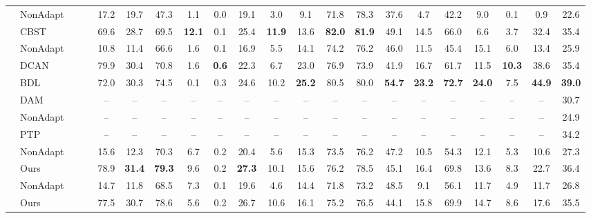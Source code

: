 \documentclass[10pt,twocolumn,letterpaper]{article}
\newcommand{\cmark}{\ding{51}}\newcommand{\xmark}{\ding{55}}\newcommand{\multicmark}{\textcolor{Maroon}{\multirow{2}{*}{\cmark}}}
\newcommand{\multixmark}{\textcolor{ForestGreen}{\multirow{2}{*}{\xmark}}}
\newcommand{\singlecmark}{\textcolor{Maroon}{\cmark}}
\begin{document}
\begin{table*}
{\begin{tabular}{c|l|cc|cccccccccccccccc|c}
&NonAdapt~\cite{eccv_unsupervised} & \multicmark &\multicmark  &17.2 &19.7 &47.3 &1.1 &0.0 &19.1 &3.0 &9.1 &71.8 &78.3 &37.6 &4.7 &42.2 &9.0 &0.1 &0.9 &22.6 \\
&CBST~\cite{eccv_unsupervised} & & &69.6 &28.7 &69.5 &\textbf{12.1} &0.1 &25.4 &\textbf{11.9} &13.6 &\textbf{82.0} &\textbf{81.9} &49.1 &14.5 &66.0 &6.6 &3.7 &32.4 &35.4 \\ \cline{2-21}

&NonAdapt~\cite{wu2018dcan} &\multicmark &\multicmark  &10.8 &11.4 &66.6 &1.6 &0.1 &16.9 &5.5 &14.1 &74.2 &76.2 &46.0 &11.5 &45.4 &15.1 &6.0 &13.4 &25.9 \\ 
&DCAN~\cite{wu2018dcan} & &  &79.9 &30.4 &70.8 &1.6 &\textbf{0.6} &22.3 &6.7 &23.0 &76.9 &73.9 &41.9 &16.7 &61.7 &11.5 &\textbf{10.3} &38.6 &35.4 \\ \cline{2-21}

&BDL~\cite{li2019bidirectional} &\singlecmark &\singlecmark  &72.0 &30.3 &74.5 &0.1 &0.3 &24.6 &10.2 &\textbf{25.2} &80.5 &80.0 &\textbf{54.7} &\textbf{23.2} &\textbf{72.7} &\textbf{24.0} &7.5 &\textbf{44.9} &\textbf{39.0} \\ \cline{2-21}

&DAM~\cite{huang2018domain} & \singlecmark &\singlecmark  &-- &-- &-- &-- &-- &-- &-- &-- &-- &-- &-- &-- &-- &-- &-- &-- &30.7 \\ \cline{2-21}

&NonAdapt~\cite{zhu2018penalizing} &\multicmark &\multicmark  &-- &-- &-- &-- &-- &-- &-- &-- &-- &-- &-- &-- &-- &-- &-- &-- &24.9 \\ 
&PTP~\cite{zhu2018penalizing} & &  &-- &-- &-- &-- &-- &-- &-- &-- &-- &-- &-- &-- &-- &-- &-- &-- &34.2 \\ \cline{2-21}

&NonAdapt & \multixmark& \multicmark &15.6 &12.3 &70.3 &6.7 &0.2 &20.4 &5.6 &15.3 &73.5 &76.2 &47.2 &10.5 &54.3 &12.1 &5.3 &10.6 &27.3 \\
&Ours & &  &78.9 &\textbf{31.4} &\textbf{79.3} &9.6 &0.2 &\textbf{27.3} &10.1 &15.6 &76.2 &78.5 &45.1 &16.4 &69.8 &13.6 &8.3 &22.7 &36.4 \\ \cline{2-21}

&NonAdapt & \multixmark& \multixmark &14.7 &11.8 &68.5 &7.3 &0.1 &19.6 &4.6 &14.4 &71.8 &73.2 &48.5 &9.1 &56.1 &11.7 &4.9 &11.7 &26.8\\ 
&Ours & &  &77.5 &30.7 &78.6 &5.6 &0.2 &26.7 &10.6 &16.1 &75.2 &76.5 &44.1 &15.8 &69.9 &14.7 &8.6 &17.6 &35.5\\ \bottomrule
\end{tabular}
}
\vspace{-2mm}
\label{tab:adaptation_synthia}
\end{table*}
\end{document}
